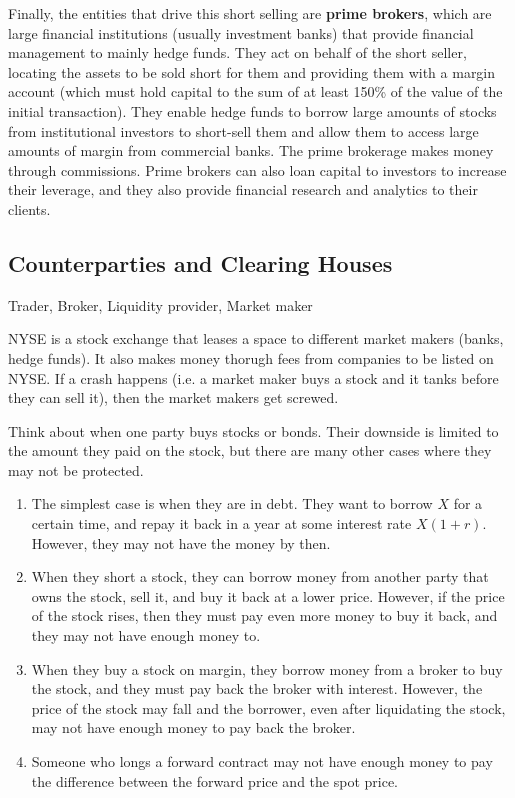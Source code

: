 \documentclass{article}
\begin{document}
      Finally, the entities that drive this short selling are \textbf{prime brokers}, which are large financial institutions (usually investment banks) that provide financial management to mainly hedge funds. They act on behalf of the short seller, locating the assets to be sold short for them and providing them with a margin account (which must hold capital to the sum of at least 150\% of the value of the initial transaction). They enable hedge funds to borrow large amounts of stocks from institutional investors to short-sell them and allow them to access large amounts of margin from commercial banks. The prime brokerage makes money through commissions. Prime brokers can also loan capital to investors to increase their leverage, and they also provide financial research and analytics to their clients. 

  \subsection{Counterparties and Clearing Houses}

    Trader, Broker, Liquidity provider, Market maker 

    NYSE is a stock exchange that leases a space to different market makers (banks, hedge funds). It also makes money thorugh fees from companies to be listed on NYSE. If a crash happens (i.e. a market maker buys a stock and it tanks before they can sell it), then the market makers get screwed. 

    Think about when one party buys stocks or bonds. Their downside is limited to the amount they paid on the stock, but there are many other cases where they may not be protected. 

    \begin{example}
      \begin{enumerate}
        \item The simplest case is when they are in debt. They want to borrow $X$ for a certain time, and repay it back in a year at some interest rate $X (1 + r)$. However, they may not have the money by then. 
        \item When they short a stock, they can borrow money from another party that owns the stock, sell it, and buy it back at a lower price. However, if the price of the stock rises, then they must pay even more money to buy it back, and they may not have enough money to. 
        \item When they buy a stock on margin, they borrow money from a broker to buy the stock, and they must pay back the broker with interest. However, the price of the stock may fall and the borrower, even after liquidating the stock, may not have enough money to pay back the broker.
        \item Someone who longs a forward contract may not have enough money to pay the difference between the forward price and the spot price.
      \end{enumerate}
    \end{example}
\end{document}
